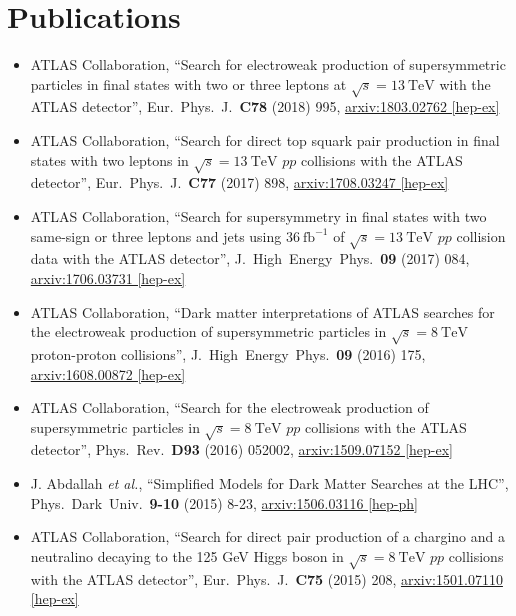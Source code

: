 \documentclass[a4paper,10pt]{article}
\begin{document}
\section{Publications}

\begin{itemize}
	\item ATLAS Collaboration,
	``Search for electroweak production of supersymmetric particles in final states with two or three leptons at $\sqrt{s}=13\ \mathrm{TeV}$ with the ATLAS detector'',
	Eur.\ Phys.\ J.\ {\bf C78} (2018) 995,
	\href{https://arxiv.org/abs/1803.02762}{arxiv:1803.02762 [hep-ex]}	
	\item ATLAS Collaboration,
	``Search for direct top squark pair production in final states with two leptons in $\sqrt{s}=13\ \mathrm{TeV}$ $pp$ collisions with the ATLAS detector'',
	Eur.\ Phys.\ J.\ {\bf C77} (2017) 898,
	\href{https://arxiv.org/abs/1708.03247}{arxiv:1708.03247 [hep-ex]}
	\item ATLAS Collaboration,
	``Search for supersymmetry in final states with two same-sign or three leptons and jets using $36\ \mathrm{fb}^{-1}$ of $\sqrt{s}=13\ \mathrm{TeV}$ $pp$ collision data with the ATLAS detector'',
	J.\ High\ Energy\ Phys.\ {\bf 09} (2017) 084,
	\href{https://arxiv.org/abs/1706.03731}{arxiv:1706.03731 [hep-ex]}
	\item ATLAS Collaboration,
	``Dark matter interpretations of ATLAS searches for the electroweak production of supersymmetric particles in $\sqrt{s} = 8\ \mathrm{TeV}$ proton-proton collisions'',
	J.\ High\ Energy\ Phys.\ {\bf 09} (2016) 175,
	\href{http://arxiv.org/abs/1608.00872}{arxiv:1608.00872 [hep-ex]}
	\item ATLAS Collaboration,
	``Search for the electroweak production of supersymmetric particles in $\sqrt{s} = 8\ \mathrm{TeV}$ $pp$ collisions with the ATLAS detector'',
	Phys.\ Rev.\ {\bf D93} (2016) 052002,
	\href{http://arxiv.org/abs/1509.07152}{arxiv:1509.07152 [hep-ex]}
	\item J. Abdallah {\it et al.},
	``Simplified Models for Dark Matter Searches at the LHC'',
	Phys.\ Dark\ Univ.\ {\bf 9-10} (2015) 8-23,
	\href{http://arxiv.org/abs/1506.03116}{arxiv:1506.03116 [hep-ph]}
	\item ATLAS Collaboration,
	``Search for direct pair production of a chargino and a neutralino decaying to the 125 GeV Higgs boson in $\sqrt{s} = 8\ \mathrm{TeV}$ $pp$ collisions with the ATLAS detector'',
	Eur.\ Phys.\ J.\ {\bf C75} (2015) 208,
	\href{http://arxiv.org/abs/1501.07110}{arxiv:1501.07110 [hep-ex]}

\end{itemize}
\end{document}

